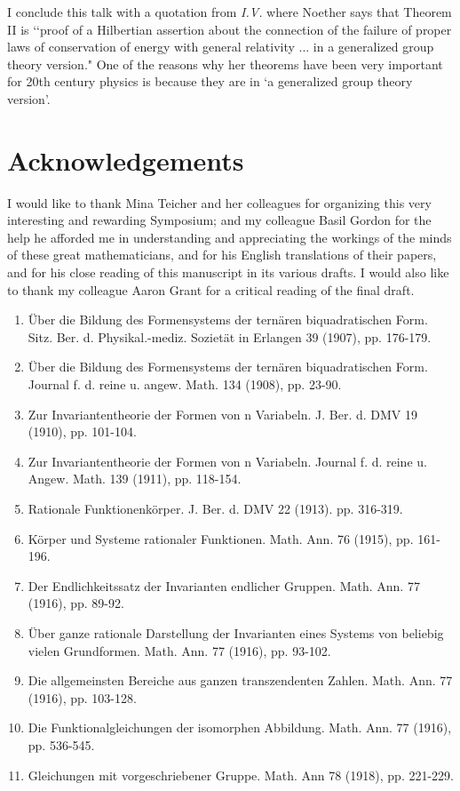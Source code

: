 \documentclass[12pt]{article}
\begin{document}
I conclude this talk with a quotation from {\it{I.V.}} where
    Noether says that  Theorem II is  \lq\lq  proof
of a Hilbertian assertion about the connection of the failure of
proper laws of conservation of energy with general relativity ... in
a generalized
group theory version."  One of the reasons why her theorems have been very important for 20th century  physics is because they are in `a generalized group theory version'.

\section*{Acknowledgements}
I would like to thank Mina Teicher and her colleagues for organizing this very interesting and rewarding Symposium; and my colleague Basil Gordon for the help he afforded me in understanding and appreciating the workings of the minds of these
great mathematicians, and for his English translations of their papers,
and for his close reading of this manuscript in its various drafts. 
I would also like to thank my colleague Aaron Grant for a critical reading of
the final draft.
\newpage
{}

\begin{enumerate}
\item{} \"Uber die Bildung des Formensystems der tern\"aren 
biquadratischen Form.
  Sitz. Ber. d. Physikal.-mediz. Soziet\"at in Erlangen 39
 (1907), pp. 176-179.
\item{}  \"Uber die Bildung des Formensystems der tern\"aren 
biquadratischen Form.
   Journal f. d. reine u. angew. Math. 134 (1908),
 pp. 23-90.
\item{} Zur Invariantentheorie der Formen von n Variabeln.
  J. Ber. d. DMV 19 (1910), pp. 101-104.
\item{} Zur Invariantentheorie der Formen von n Variabeln.
  Journal f. d. reine u. Angew. Math. 139 (1911), pp. 118-154.
\item{} Rationale Funktionenk\"orper.
J. Ber. d. DMV 22 (1913). pp. 316-319.
\item{} K\"orper und Systeme rationaler Funktionen.
  Math. Ann. 76 (1915), pp. 161-196.
\item{} Der Endlichkeitssatz der Invarianten endlicher Gruppen.
  Math. Ann. 77 (1916), pp. 89-92.
\item{} \"Uber ganze rationale Darstellung der Invarianten
 eines Systems von beliebig vielen Grundformen.
  Math. Ann. 77 (1916), pp. 93-102. 
 \item{} Die allgemeinsten Bereiche aus ganzen 
 transzendenten Zahlen.
  Math. Ann. 77 (1916), pp. 103-128. 
 \item{} Die Funktionalgleichungen der isomorphen Abbildung.
  Math. Ann. 77 (1916), pp. 536-545.
 \item{} Gleichungen mit vorgeschriebener Gruppe.
  Math. Ann 78 (1918), pp. 221-229. 

\end{enumerate}
\newpage
\end{document}
